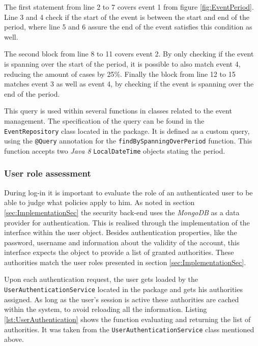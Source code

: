 The first statement from line 2 to 7 covers event 1 from figure \vref{fig:EventPeriod}. Line 3 and 4 check if the start of the event is between the start and end of the period, where line 5 and 6 assure the end of the event satisfies this condition as well.

The second block from line 8 to 11 covers event 2. By only checking if the event is spanning over the start of the period, it is possible to also match event 4, reducing the amount of cases by 25\%. Finally the block from line 12 to 15 matches event 3 as well as event 4, by checking if the event is spanning over the end of the period. 

This query is used within several functions in classes related to the event management. The specification of the query can be found in the \texttt{EventRepository} class located in the  package. It is defined as a custom query, using the \texttt{@Query} annotation for the \texttt{findBySpanningOverPeriod} function. This function accepts two \emph{Java 8} \texttt{LocalDateTime} objects stating the period.

\subsubsection{User role assessment}

During log-in it is important to evaluate the role of an authenticated user to be able to judge what policies apply to him. As noted in section \vref{sec:ImplementationSec} the security back-end uses the \emph{MongoDB} as a data provider for authentication. This is realised through the implementation of the  interface within the user object. Besides authentication properties, like the password, username and information about the validity of the account, this interface expects the object to provide a list of granted authorities. These authorities match the user roles presented in section \vref{sec:ImplementationSec}. 

Upon each authentication request, the user gets loaded by the \texttt{UserAuthenticationService} located in the  package and gets his authorities assigned. As long as the user's session is active these authorities are cached within the system, to avoid reloading all the information. Listing \vref{lst:UserAuthentication} shows the function evaluating and returning the list of authorities. It was taken from the \texttt{UserAuthenticationService} class mentioned above. 

